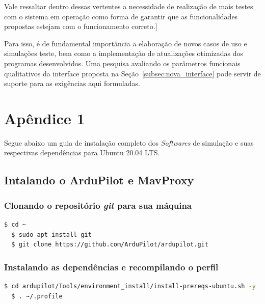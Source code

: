 \documentclass[12pt,a4paper,oneside]{book}
\begin{document}
Vale ressaltar dentro dessas vertentes a necessidade de realização de mais testes com o sistema em operação como forma de garantir que as funcionalidades propostas estejam com o funcionamento correto.]

Para isso, é de fundamental importância a elaboração de novos casos de uso e simulações teste, bem como a implementação de atualizações otimizadas dos programas desenvolvidos. Uma pesquisa avaliando os parâmetros funcionais qualitativos da interface proposta na Seção~\ref{subsec:nova_interface} pode servir de suporte para as exigências aqui formuladas.





%

%
%
\thispagestyle{myheadings}

%

%
%
%
%
\appendix
%
%
%
\chapter{Apêndice 1}
%
\thispagestyle{empty} 
%
Segue abaixo um guia de instalação completo dos \textit{Softwares} de simulação e suas respectivas dependências para Ubuntu 20.04 LTS.

\section{Intalando o ArduPilot e MavProxy}

\subsection{Clonando o repositório \textit{git} para sua máquina}
\begin{lstlisting}[language=bash]
  $ cd ~
  $ sudo apt install git
  $ git clone https://github.com/ArduPilot/ardupilot.git
\end{lstlisting}

\subsection{Instalando as dependências e recompilando o perfil}
\begin{lstlisting}[language=bash]
  $ cd ardupilot/Tools/environment_install/install-prereqs-ubuntu.sh -y
  $ . ~/.profile
\end{lstlisting}
\end{document}
